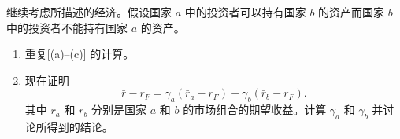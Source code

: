 \par\noindent\begin{minipage}{\linewidth}
\begin{problem}
 继续考虑所描述的经济。假设国家 $a$ 中的投资者可以持有国家 $b$ 的资产而国家 $b$ 中的投资者不能持有国家 $a$ 的资产。
\begin{enumerate}[label=(\alph*)]
    \item 重复[(a)--(c)] 的计算。
    \item 现在证明
    \[
        \bar{r}-r_{F}=\gamma_{a}(\bar{r}_{a}-r_{F})+\gamma_{b}(\bar{r}_{b}-r_{F}).
    \]
    其中 $\bar{r}_{a}$ 和 $\bar{r}_{b}$ 分别是国家 $a$ 和 $b$ 的市场组合的期望收益。计算 $\gamma_{a}$ 和 $\gamma_{b}$ 并讨论所得到的结论。
\end{enumerate}
\end{problem}
\end{minipage}\par
{}
